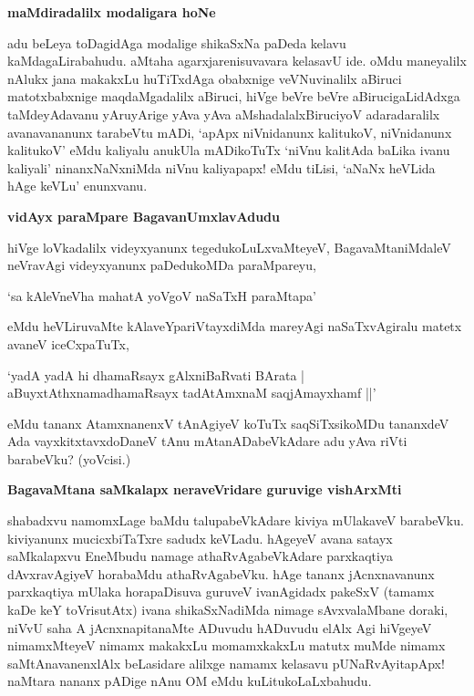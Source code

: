 \noindent
\textbf{maMdiradalilx modaligara hoNe}\label{page70}

adu beLeya toDagidAga modalige shikaSxNa paDeda kelavu kaMdagaLirabahudu. aMtaha agarxjarenisuvavara kelasavU ide. oMdu maneyalilx nAlukx jana makakxLu huTiTxdAga obabxnige veVNuvinalilx aBiruci matotxbabxnige maqdaMgadalilx aBiruci, hiVge beVre beVre aBirucigaLidAdxga taMdeyAdavanu yAruyArige yAva yAva aMshadalalxBiruciyoV adaradaralilx avanavananunx tarabeVtu mADi, `apApx niVnidanunx kalitukoV, niVnidanunx kalitukoV' eMdu kaliyalu anukUla mADikoTuTx `niVnu kalitAda baLika ivanu kaliyali' ninanxNaNxniMda niVnu kaliyapapx! eMdu tiLisi, `aNaNx heVLida hAge keVLu' enunxvanu.

\noindent
\textbf{vidAyx paraMpare BagavanUmxlavAdudu}

hiVge loVkadalilx videyxyanunx tegedukoLuLxvaMteyeV, BagavaMtaniMdaleV neVravAgi videyxyanunx paDedukoMDa paraMpareyu,

\begin{shloka}
`sa kAleVneVha mahatA yoVgoV naSaTxH paraMtapa'\label{62}\label{70}
\end{shloka}

eMdu heVLiruvaMte kAlaveYpariVtayxdiMda mareyAgi naSaTxvAgiralu matetx avaneV iceCxpaTuTx,

\begin{shloka}
`yadA yadA hi dhamaRsayx gAlxniBaRvati BArata |\\\label{71}
aBuyxtAthxnamadhamaRsayx tadAtAmxnaM saqjAmayxhamf ||'
\end{shloka}

eMdu tananx AtamxnanenxV tAnAgiyeV koTuTx saqSiTxsikoMDu tananxdeV Ada vayxkitxtavxdoDaneV tAnu mAtanADabeVkAdare adu yAva riVti barabeVku? (yoVcisi.)

\noindent
\textbf{BagavaMtana saMkalapx neraveVridare guruvige vishArxMti}\label{page71}

shabadxvu namomxLage baMdu talupabeVkAdare kiviya mUlakaveV barabeVku. kiviyanunx mucicxbiTaTxre sadudx keVLadu. hAgeyeV avana satayx saMkalapxvu EneMbudu namage athaRvAgabeVkAdare parxkaqtiya dAvxravAgiyeV horabaMdu athaRvAgabeVku. hAge tananx jAcnxnavanunx parxkaqtiya mUlaka horapaDisuva guruveV ivanAgidadx pakeSxV (tamamx kaDe keY toVrisutAtx) ivana shikaSxNadiMda nimage sAvxvalaMbane doraki, niVvU saha A jAcnxnapitanaMte ADuvudu hADuvudu elAlx Agi hiVgeyeV nimamxMteyeV nimamx makakxLu momamxkakxLu matutx muMde nimamx saMtAnavanenxlAlx beLasidare alilxge namamx kelasavu pUNaRvAyitapApx! naMtara nananx pADige nAnu OM eMdu kuLitukoLaLxbahudu.

